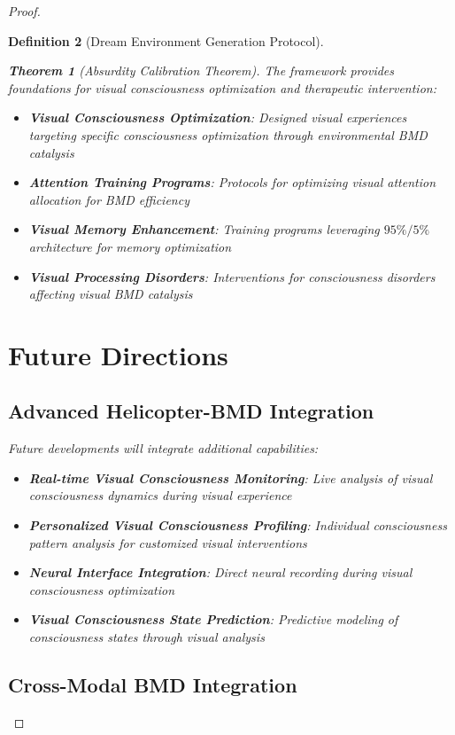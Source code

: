 \documentclass[12pt,a4paper]{article}
\newtheorem{theorem}{Theorem}[section]
\newtheorem{definition}[theorem]{Definition}
\begin{document}
\begin{proof}
\begin{definition}[Dream Environment Generation Protocol]
\begin{theorem}[Absurdity Calibration Theorem]
The framework provides foundations for visual consciousness optimization and therapeutic intervention:

\begin{itemize}
\item \textbf{Visual Consciousness Optimization}: Designed visual experiences targeting specific consciousness optimization through environmental BMD catalysis
\item \textbf{Attention Training Programs}: Protocols for optimizing visual attention allocation for BMD efficiency
\item \textbf{Visual Memory Enhancement}: Training programs leveraging $95\%/5\%$ architecture for memory optimization
\item \textbf{Visual Processing Disorders}: Interventions for consciousness disorders affecting visual BMD catalysis
\end{itemize}

\section{Future Directions}

\subsection{Advanced Helicopter-BMD Integration}

Future developments will integrate additional capabilities:

\begin{itemize}
\item \textbf{Real-time Visual Consciousness Monitoring}: Live analysis of visual consciousness dynamics during visual experience
\item \textbf{Personalized Visual Consciousness Profiling}: Individual consciousness pattern analysis for customized visual interventions
\item \textbf{Neural Interface Integration}: Direct neural recording during visual consciousness optimization
\item \textbf{Visual Consciousness State Prediction}: Predictive modeling of consciousness states through visual analysis
\end{itemize}

\subsection{Cross-Modal BMD Integration}


\end{theorem}
\end{definition}
\end{proof}
\end{document}
